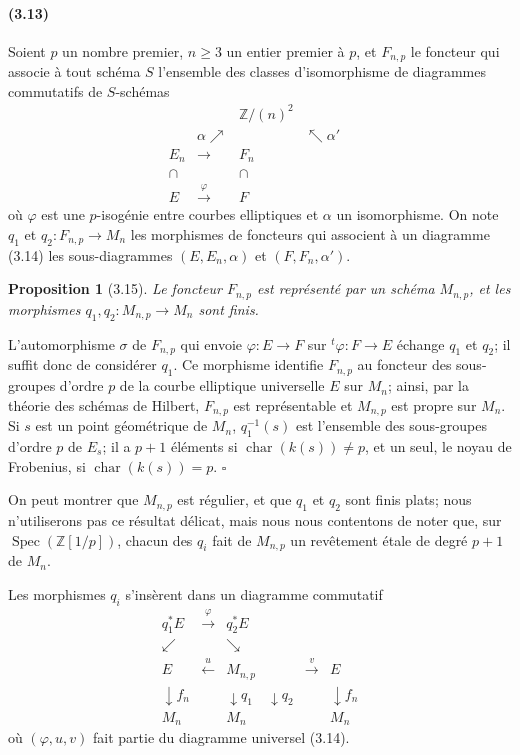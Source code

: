 \documentclass[10pt]{article}
\newcommand{\Z}{\mathbb Z}
\newcommand{\Spec}{\operatorname{Spec}}
\newcommand{\QED}{\hfill$\square$}
\newcommand{\charop}{\operatorname{char}}
\newtheorem*{proposition}{Proposition}
\begin{document}
\paragraph{(3.13)}
Soient $p$ un nombre premier, $n\geq 3$ un entier premier à $p$, et $F_{n,p}$ le foncteur qui associe à tout schéma $S$ l'ensemble des classes d'isomorphisme de diagrammes commutatifs de $S$-schémas
\[
\begin{array}{ccccc}
&& \Z/(n)^2 &&\\[-0.2em]
& \alpha\nearrow && \nwarrow\alpha' &\\[-0.2em]
E_n & \longrightarrow & F_n &&\\[-0.2em]
\cap && \cap &&\\[-0.2em]
E & \xrightarrow{\ \varphi\ } & F &&
\end{array}
\tag{3.14}
\]
où $\varphi$ est une $p$-isogénie entre courbes elliptiques et $\alpha$ un isomorphisme. On note $q_1$ et $q_2:F_{n,p}\to M_n$ les morphismes de foncteurs qui associent à un diagramme (3.14) les sous-diagrammes $(E,E_n,\alpha)$ et $(F,F_n,\alpha')$.

\begin{proposition}[3.15]
Le foncteur $F_{n,p}$ est représenté par un schéma $M_{n,p}$, et les morphismes $q_1,q_2:M_{n,p}\to M_n$ sont finis.
\end{proposition}

L'automorphisme $\sigma$ de $F_{n,p}$ qui envoie $\varphi:E\to F$ sur ${}^{t}\!\varphi:F\to E$ échange $q_1$ et $q_2$; il suffit donc de considérer $q_1$. Ce morphisme identifie $F_{n,p}$ au foncteur des sous-groupes d'ordre $p$ de la courbe elliptique universelle $E$ sur $M_n$; ainsi, par la théorie des schémas de Hilbert, $F_{n,p}$ est représentable et $M_{n,p}$ est propre sur $M_n$. Si $s$ est un point géométrique de $M_n$, $q_1^{-1}(s)$ est l'ensemble des sous-groupes d'ordre $p$ de $E_s$; il a $p+1$ éléments si $\charop(k(s))\ne p$, et un seul, le noyau de Frobenius, si $\charop(k(s))=p$. \QED

On peut montrer que $M_{n,p}$ est régulier, et que $q_1$ et $q_2$ sont finis plats; nous n'utiliserons pas ce résultat délicat, mais nous nous contentons de noter que, sur $\Spec(\Z[1/p])$, chacun des $q_i$ fait de $M_{n,p}$ un revêtement étale de degré $p+1$ de $M_n$.

Les morphismes $q_i$ s'insèrent dans un diagramme commutatif
\[
\begin{array}{ccccc}
q_1^*E & \xrightarrow{\ \varphi\ } & q_2^*E &&\\[-0.2em]
\swarrow && \searrow &&\\[-0.2em]
E & \xleftarrow{\ u\ } & M_{n,p} & \xrightarrow{\ v\ } & E\\[-0.2em]
\downarrow f_n && \downarrow q_1\quad\downarrow q_2 && \downarrow f_n\\[-0.2em]
M_n && M_n && M_n
\end{array}
\tag{3.16}
\]
où $(\varphi,u,v)$ fait partie du diagramme universel (3.14).
\end{document}

